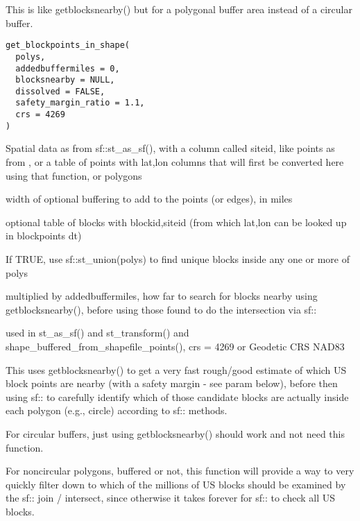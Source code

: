 \documentclass[a4paper]{book}
\begin{document}
%
\begin{Description}\relax
This is like getblocksnearby() but for a polygonal buffer area instead of
a circular buffer.
\end{Description}
%
\begin{Usage}
\begin{verbatim}
get_blockpoints_in_shape(
  polys,
  addedbuffermiles = 0,
  blocksnearby = NULL,
  dissolved = FALSE,
  safety_margin_ratio = 1.1,
  crs = 4269
)
\end{verbatim}
\end{Usage}
%
\begin{Arguments}
\begin{ldescription}
\item[\code{polys}] Spatial data as from sf::st\_as\_sf(), with a column called siteid, like
points as from ,
or a table of points with lat,lon columns that will first be converted here using that function,
or polygons

\item[\code{addedbuffermiles}] width of optional buffering to add to the points (or edges), in miles

\item[\code{blocksnearby}] optional table of blocks with blockid,siteid (from which lat,lon can be looked up in blockpoints dt)

\item[\code{dissolved}] If TRUE, use sf::st\_union(polys) to find unique blocks inside any one or more of polys

\item[\code{safety\_margin\_ratio}] multiplied by addedbuffermiles, how far to search for
blocks nearby using getblocksnearby(), before using those found to do the intersection via sf::

\item[\code{crs}] used in st\_as\_sf() and st\_transform() and shape\_buffered\_from\_shapefile\_points(), crs = 4269 or Geodetic CRS NAD83
\end{ldescription}
\end{Arguments}
%
\begin{Details}\relax
This uses getblocksnearby() to get a very fast rough/good estimate of
which US block points are nearby (with a safety margin - see param below),
before then using sf:: to carefully identify which of those candidate blocks are actually
inside each polygon (e.g., circle) according to sf:: methods.

For circular buffers, just using getblocksnearby() should work and not need this function.

For noncircular polygons, buffered or not, this function will provide a way to very quickly
filter down to which of the millions of US blocks should be examined by the sf:: join / intersect,
since otherwise it takes forever for sf:: to check all US blocks.
\end{Details}
\end{document}
